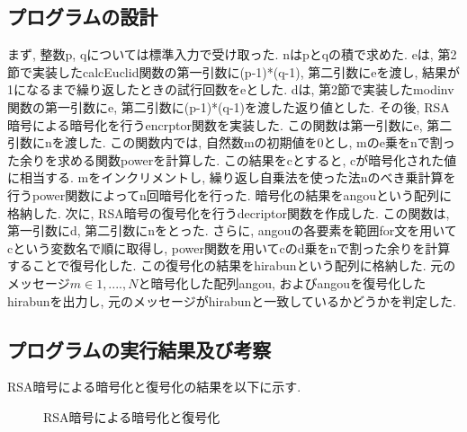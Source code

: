 \documentclass[xelatex, 11pt, a4paper, ja=standard]{bxjsarticle}
\begin{document}
\subsection{プログラムの設計}
まず, 整数p, qについては標準入力で受け取った. nはpとqの積で求めた. 
eは, 第2節で実装したcalcEuclid関数の第一引数に(p-1)*(q-1), 第二引数にeを渡し, 
結果が1になるまで繰り返したときの試行回数をeとした. 
dは, 第2節で実装したmodinv関数の第一引数にe, 第二引数に(p-1)*(q-1)を渡した返り値とした. 
その後, RSA暗号による暗号化を行うencrptor関数を実装した. 
この関数は第一引数にe, 第二引数にnを渡した. 
この関数内では, 自然数mの初期値を0とし, mのe乗をnで割った余りを求める関数powerを計算した. 
この結果をcとすると, cが暗号化された値に相当する. 
mをインクリメントし, 繰り返し自乗法を使った法nのべき乗計算を行うpower関数によってn回暗号化を行った. 
暗号化の結果をangouという配列に格納した. 
次に, RSA暗号の復号化を行うdecriptor関数を作成した. 
この関数は, 第一引数にd, 第二引数にnをとった. 
さらに, angouの各要素を範囲for文を用いてcという変数名で順に取得し, power関数を用いてcのd乗をnで割った余りを計算することで復号化した. 
この復号化の結果をhirabunという配列に格納した. 
元のメッセージ$m\in{1,....,N}$と暗号化した配列angou, およびangouを復号化したhirabunを出力し, 
元のメッセージがhirabunと一致しているかどうかを判定した. 


\subsection{プログラムの実行結果及び考察}
RSA暗号による暗号化と復号化の結果を以下に示す. 

\begin{figure}[htbp]
    \centering
    \begin{center}
\end{center}
\caption{RSA暗号による暗号化と復号化}
\label{fig:screenshot}
\end{figure}
\end{document}
